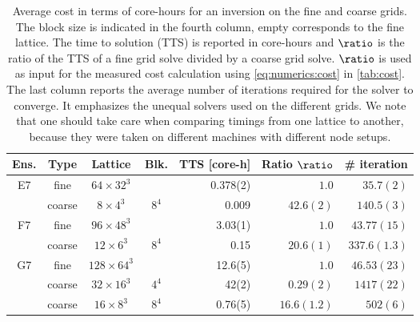 \begin{table}[b!]
\begin{tabular}{ccccrrr}
\toprule
{Ens.} & 
{Type} & 
{Lattice} & 
{Blk.} &
{TTS [core-h]} &
Ratio $\ratio$&
{\# iteration} \\
\midrule
E7              & fine   & $64  \times 32^3$ &       & 0.378(2)  & $1.0$       & $35.7(2)$    \\
                & coarse & $8   \times 4^3$  & $8^4$ & 0.009     & $42.6(2)$   & $140.5(3)$   \\
\midrule                                                                        
F7              & fine   & $96  \times 48^3$ &       & 3.03(1)   & $1.0$       & $43.77(15)$  \\
                & coarse & $12  \times 6^3$  & $8^4$ & 0.15      & $20.6(1)$   & $337.6(1.3)$ \\
\midrule                                                                        
G7              & fine   & $128 \times 64^3$ &       & 12.6(5)   & $1.0$       & $46.53(23)$  \\
                & coarse & $32  \times 16^3$ & $4^4$ & 42(2)     & $0.29(2)$   & $1417(22)$   \\
                & coarse & $16  \times 8^3$  & $8^4$ & 0.76(5)   & $16.6(1.2)$ & $502(6)$     \\
\bottomrule
\end{tabular}
\caption{\label{tab:cost:imp}
Average cost in terms of core-hours for an inversion on the fine and coarse grids.
The block size is indicated in the fourth column, empty corresponds to the fine lattice.
The time to solution (TTS) is reported in core-hours and $\ratio$ is the ratio of the TTS of a fine grid solve divided by a coarse grid solve.
$\ratio$ is used as input for the measured cost calculation using \cref{eq:numerics:cost} in \cref{tab:cost}.
The last column reports the average number of iterations required for the solver to converge.
It emphasizes the unequal solvers used on the different grids.
We note that one should take care when comparing timings from one lattice to another, because they were taken on different machines with different node setups.
% 
}
\end{table}

